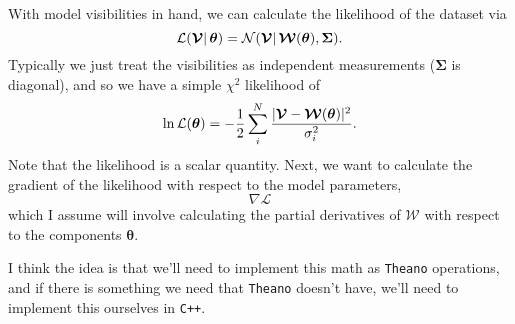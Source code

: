 \documentclass[modern]{aastex62}
\newcommand{\vd}{\boldsymbol{\mathcal{V}}} %
\newcommand{\vm}{\boldsymbol{\mathcal{W}}} %
\newcommand{\btheta}{\boldsymbol{\theta}} %
\begin{document}
With model visibilities in hand, we can calculate the likelihood of the dataset via
\begin{equation}
    {\cal L}(\vd |\, \boldsymbol{\theta}) = {\cal N}(\boldsymbol{\mathcal{V}} |\, \boldsymbol{\mathcal{W}}(\boldsymbol{\theta}), \boldsymbol{\Sigma}).
\end{equation}
Typically we just treat the visibilities as independent measurements ($\boldsymbol{\Sigma}$ is diagonal), and so we have a simple $\chi^2$ likelihood of
\begin{equation}
    \ln {\cal L}(\btheta) = - \frac{1}{2} \sum_i^N \frac{|\vd - \vm(\btheta)|^2}{\sigma_i^2}.
\end{equation}
Note that the likelihood is a scalar quantity. Next, we want to calculate the gradient of the likelihood with respect to the model parameters,
\begin{equation}
    \nabla \mathcal{L}
\end{equation}
which I assume will involve calculating the partial derivatives of $\vm$ with respect to the components $\btheta$. 

I think the idea is that we'll need to implement this math as \texttt{Theano} operations, and if there is something we need that \texttt{Theano} doesn't have, we'll need to implement this ourselves in \texttt{C++}.
\end{document}
